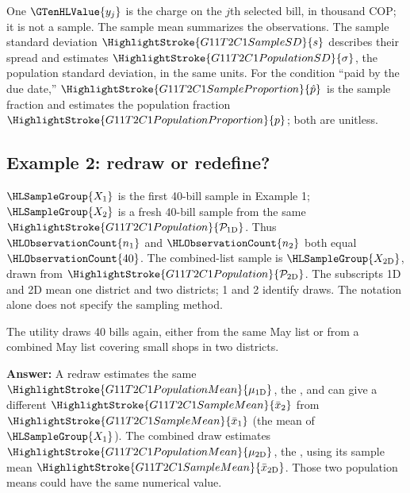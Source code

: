 	One  $\GTenHLValue{y_j}$ is the charge on the $j$th selected bill, in thousand COP; it is not a sample. The sample mean summarizes the observations. The sample standard deviation $\HighlightStroke{G11T2C1SampleSD}{s}$ describes their spread and estimates $\HighlightStroke{G11T2C1PopulationSD}{\sigma}$, the population standard deviation, in the same units. For the condition ``paid by the due date,'' $\HighlightStroke{G11T2C1SampleProportion}{\hat{p}}$ is the sample fraction and estimates the population fraction $\HighlightStroke{G11T2C1PopulationProportion}{p}$; both are unitless.


	\subsection{Example 2: redraw or redefine?}
	\label{subsec:c1-quick-check}

    $\HLSampleGroup{X_1}$ is the first 40-bill sample in Example 1; $\HLSampleGroup{X_2}$ is a fresh 40-bill sample from the same $\HighlightStroke{G11T2C1Population}{\mathcal{P}_{\mathrm{1D}}}$. Thus $\HLObservationCount{n_1}$ and $\HLObservationCount{n_2}$ both equal $\HLObservationCount{40}$. The combined-list sample is $\HLSampleGroup{X_{\mathrm{2D}}}$, drawn from $\HighlightStroke{G11T2C1Population}{\mathcal{P}_{\mathrm{2D}}}$. The subscripts 1D and 2D mean one district and two districts; 1 and 2 identify draws. The notation alone does not specify the sampling method.


	The utility draws 40 bills again, either from the same May list or from a combined May list covering small shops in two districts. 

	\label{sol:c1-quick-check}

	\textbf{Answer:} A redraw estimates the same $\HighlightStroke{G11T2C1PopulationMean}{\mu_{\mathrm{1D}}}$, the  , and can give a different $\HighlightStroke{G11T2C1SampleMean}{\bar{x}_{2}}$ from $\HighlightStroke{G11T2C1SampleMean}{\bar{x}_{1}}$ (the mean of $\HLSampleGroup{X_1}$). The combined draw estimates $\HighlightStroke{G11T2C1PopulationMean}{\mu_{\mathrm{2D}}}$, the  , using its sample mean $\HighlightStroke{G11T2C1SampleMean}{\bar{x}_{\mathrm{2D}}}$. Those two population means could have the same numerical value.

